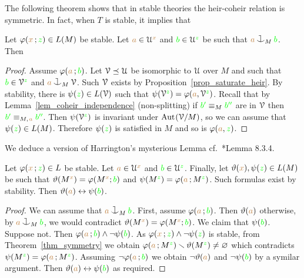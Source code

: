 The following theorem shows that in stable theories the heir-coheir relation is symmetric.
In fact, when $T$ is stable, it implies that


\begin{theorem}[ (Symmetry)]\label{thm_symmetry}
  Let $\varphi({\color{brown} x}\,;{\color{green} z})\in L(M)$ be stable.
  Let ${\color{brown} a}\in\EuScript U^{\color{brown} x}$ and ${\color{green} b}\in\EuScript U^{\color{green} z}$ be such that ${\mr a}\cnonfork_M{\gr b}$.
  Then

\end{theorem}

\vspace*{-\parskip}
\begin{proof}
  Assume $\varphi({\color{brown} a}\,;{\color{green} b})$.
  Let $\EuScript V\preceq\EuScript U$ be isomorphic to $\EuScript U$ over $M$ and such that ${\color{green} b}\in\EuScript V^{\color{green} z}$ and ${\mr a}\cnonfork_M\V$. Such $\EuScript V$ exists by Proposition~\ref{prop_saturate_heir}.
  By stability, there is $\psi({\color{green} z})\in L(\EuScript V)$ such that $\psi(\EuScript V^{\color{green} z})=\varphi({\color{brown} a},\EuScript V^{\color{green} z})$.
  Recall that by Lemma~\ref{lem_coheir_independence} (non-splitting) if ${\color{green} b'}\equiv_M{\color{green} b''}$ are in $\EuScript V$ then ${\color{green} b'}\equiv_{M,\kern.2ex{\color{brown} a}}{\color{green} b''}$.
  Then $\psi(\EuScript V^{\color{green} z})$ is invariant under ${\rm Aut\kern.15ex}(\EuScript V/M)$, so we can assume that $\psi({\color{green} z})\in L(M)$.
  Therefore $\psi({\color{green} z})$ is satisfied in $M$ and so is $\varphi({\color{brown} a},{\color{green} z})$.
\end{proof}

We deduce a version of Harrington's mysterious Lemma cf.~\cite{TZ}*{Lemma 8.3.4}.

\begin{corollary}\label{corol_harrington0}
  Let $\varphi({\color{brown} x}\,;{\color{green} z})\in L$ be stable.
  Let ${\color{brown} a}\in\EuScript U^{\color{brown} x}$ and ${\color{green} b}\in\EuScript U^{\color{green} z}$.
  Finally, let $\vartheta({\color{brown} x}),\psi({\color{green} z})\in L(M)$ be such that $\vartheta(M^{\color{brown} x})=\varphi(M^{\color{brown} x};{\color{green} b})$ and $\psi(M^{\color{green} z})=\varphi({\color{brown} a}\,;M^{\color{green} z})$.
  Such formulas exist by stability.
  Then $\vartheta({\color{brown} a})\leftrightarrow\psi({\color{green} b})$.
\end{corollary}

\begin{proof}
  We can assume that ${\mr a}\cnonfork_M{\gr b}$.
  First, assume $\varphi({\color{brown} a}\,;{\color{green} b})$.
  Then $\vartheta({\color{brown} a})$ otherwise, by ${\mr a}\cnonfork_M{\gr b}$, we would contradict $\vartheta(M^{\color{brown} x})=\varphi(M^{\color{brown} x};{\color{green} b})$.
  We claim that $\psi({\color{green} b})$.
  Suppose not.
  Then $\varphi({\color{brown} a}\,;{\color{green} b})\wedge\neg\psi({\color{green} b})$.
  As $\varphi({\color{brown} x}\,;{\color{green} z})\wedge\neg\psi({\color{green} z})$ is stable, from Theorem~\ref{thm_symmetry} we obtain $\varphi({\color{brown} a}\,;M^{\color{green} z})\smallsetminus\vartheta(M^{\color{green} z})\neq\varnothing$ which contradicts  $\psi(M^{\color{green} z})=\varphi({\color{brown} a}\,;M^{\color{green} z})$.
  Assuming $\neg\varphi({\color{brown} a}\,;{\color{green} b})$ we obtain $\neg\vartheta({\color{brown} a})$ and $\neg\psi({\color{green} b})$ by a symilar argument.
  Then $\vartheta({\color{brown} a})\leftrightarrow\psi({\color{green} b})$ as required.
\end{proof}


